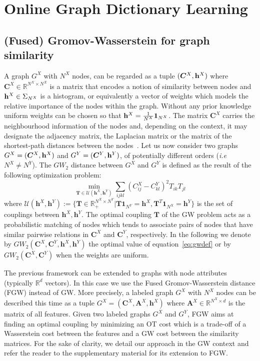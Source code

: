 \documentclass{article}
\def\eqref#1{equation~\ref{#1}}
\def\vh{{\bm{h}}}
\def\mA{{\bm{A}}}
\def\mC{{\bm{C}}}
\def\mT{{\bm{T}}}
\newcommand{\R}{\mathbb{R}}
\def\h{{\bf h}}
\def\R{{\mathbb{R}}}
\begin{document}
	
	\section{Online Graph Dictionary Learning }
	
	\subsection{(Fused) Gromov-Wasserstein for graph similarity}
	\label{subsec:GW_all}
	A graph $G^X$ with $N^X$ nodes, can be regarded as a tuple $(\mC^{X},\h^{X})$ where $\mC^{X} \in \R^{N^{X} \times N^{X}}$ is a matrix that
	encodes a notion of similarity between nodes and $\h^{X} \in \Sigma_{N^{X}}$ is
	a histogram, or equivalently a vector of weights  which models the relative importance of the nodes within the graph. Without any prior knowledge uniform weights can be chosen so that $\h^{X}=\frac{1}{N^{X}}\mathbf{1}_{N^{X}}$. The matrix $\mC^{X}$ carries the neighbourhood information of the nodes and, depending on
	the context, it may designate the adjacency matrix, the Laplacian matrix \cite{maretic2019got} or the matrix of the shortest-path distances between the nodes~\citep{bavaud2010euclidean}. Let us now consider two graphs $G^X=(\mC^{X},\h^{X})$ and $G^Y=(\mC^{Y},\h^{Y})$, {of potentially different orders (\emph{i.e} $N^X \neq N^Y$)}. The $GW_2$ distance between $G^X$ and $G^Y$ is defined as the result of the following optimization problem:
	\begin{equation}
	\label{eq:gwdef}
	\min_{\mT \in \mathcal{U}(\vh^X,\vh^Y)} \sum_{ijkl} \left( C^X_{ij}-C^Y_{kl}\right)^2T_{ik}T_{jl} 
	\end{equation}
	where $\mathcal{U}(\vh^X,\vh^Y):= \{\mT \in \R_{+}^{N^X\times N^Y}|\mT\mathbf{1}_{N^{Y}}=\vh^X, \mT^T\mathbf{1}_{N^{X}}=\vh^Y\}$ is the set of couplings between $\vh^X,\vh^Y$. 
	The optimal coupling $\mT$ of the GW problem acts as a probabilistic matching of nodes which tends to associate pairs of nodes that have similar pairwise relations in $\mC^X$ and $\mC^{Y}$, respectively. In the following we denote by $GW_2(\mC^{X},\mC^{Y},\vh^X,\vh^Y)$ the optimal value of \eqref{eq:gwdef} or  by $GW_2(\mC^{X},\mC^{Y})$ when the weights are uniform.
	
	The previous framework can be extended to graphs with node attributes
	(typically $\R^{d}$ vectors). In this case we  use the Fused
	Gromov-Wasserstein distance (FGW) \cite{vayer-fused-2018,vayer-optimal-nodate}
	instead of GW. More precisely, a labeled graph $G^X$ with $N^X$ nodes can be
	described this time as a tuple $G^X=(\mC^X,\mA^X, \vh^X)$ where $\mA^X \in \R^{N^X \times
		d}$ is the matrix of all features. Given two labeled graphs $G^X$ and $G^Y$,
	FGW aims at finding an optimal coupling by minimizing an OT cost which is a
	trade-off of a Wasserstein cost between the features and a GW cost between the
	similarity matrices. For the sake of clarity, we detail our approach in the GW context and refer the reader to the supplementary material for its extension to FGW.
	
\end{document}
